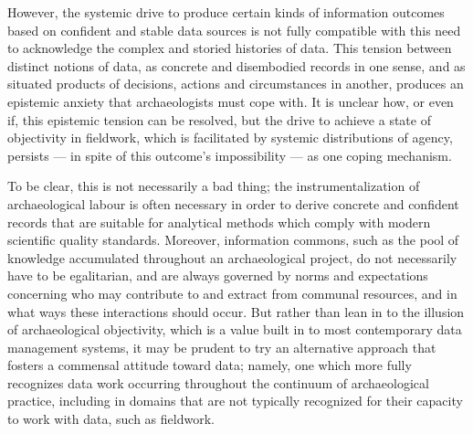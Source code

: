 \documentclass[
]{article}
\begin{document}
However, the systemic drive to produce certain kinds of information
outcomes based on confident and stable data sources is not fully
compatible with this need to acknowledge the complex and storied
histories of data. This tension between distinct notions of data, as
concrete and disembodied records in one sense, and as situated products
of decisions, actions and circumstances in another, produces an
epistemic anxiety that archaeologists must cope with. It is unclear how,
or even if, this epistemic tension can be resolved, but the drive to
achieve a state of objectivity in fieldwork, which is facilitated by
systemic distributions of agency, persists --- in spite of this
outcome's impossibility --- as one coping mechanism.

To be clear, this is not necessarily a bad thing; the
instrumentalization of archaeological labour is often necessary in order
to derive concrete and confident records that are suitable for
analytical methods which comply with modern scientific quality
standards. Moreover, information commons, such as the pool of knowledge
accumulated throughout an archaeological project, do not necessarily
have to be egalitarian, and are always governed by norms and
expectations concerning who may contribute to and extract from communal
resources, and in what ways these interactions should occur. But rather
than lean in to the illusion of archaeological objectivity, which is a
value built in to most contemporary data management systems, it may be
prudent to try an alternative approach that fosters a commensal attitude
toward data; namely, one which more fully recognizes data work occurring
throughout the continuum of archaeological practice, including in
domains that are not typically recognized for their capacity to work
with data, such as fieldwork.

\printbibliography
\end{document}
